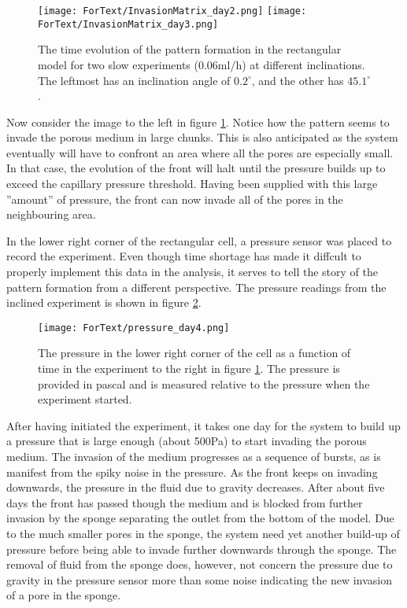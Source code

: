 \documentclass[twoside,utf8]{article}
\begin{document}
\begin{figure}[H]
	\begin{center}
\texttt{[image: ForText/InvasionMatrix\_day2.png]}
\texttt{[image: ForText/InvasionMatrix\_day3.png]}
	\end{center}
	\caption{The time evolution of the pattern formation in the rectangular model for two slow experiments (0.06ml/h) at different inclinations. The leftmost has an inclination angle of $0.2^\circ$, and the other has $45.1^\circ$. }
	\label{fig:InvasionMatricesSlow}
\end{figure}


\noindent
Now consider the image to the left in figure \ref{fig:InvasionMatricesSlow}. Notice how the pattern seems to invade the porous medium in large chunks. This is also anticipated as the system eventually will have to confront an area where all the pores are especially small. In that case, the evolution of the front will halt until the pressure builds up to exceed the capillary pressure threshold. Having been supplied with this large ''amount'' of pressure, the front can now invade all of the pores in the neighbouring area.



In the lower right corner of the rectangular cell, a pressure sensor was placed to record the experiment. Even though time shortage has made it diffcult to properly implement this data in the analysis, it serves to tell the story of the pattern formation from a different perspective. The pressure readings from the inclined experiment is shown in figure \ref{fig:pressureDay4}.

\begin{figure}[H]
	\texttt{[image: ForText/pressure\_day4.png]}
	\caption{The pressure in the lower right corner of the cell as a function of time in the experiment to the right in figure \ref{fig:InvasionMatricesSlow}. The pressure is provided in pascal and is measured relative to the pressure when the experiment started.  }
	\label{fig:pressureDay4}
\end{figure}

\noindent
After having initiated the experiment, it takes one day for the system to build up a pressure that is large enough (about 500Pa) to start invading the porous medium. The invasion of the medium progresses as a sequence of bursts, as is manifest from the spiky noise in the pressure. As the front keeps on invading downwards, the pressure in the fluid due to gravity decreases. After about five days the front has passed though the medium and is blocked from further invasion by the sponge separating the outlet from the bottom of the model. Due to the much smaller pores in the sponge, the system need yet another build-up of pressure before being able to invade further downwards through the sponge. The removal of fluid from the sponge does, however, not concern the pressure due to gravity in the pressure sensor more than some noise indicating the new invasion of a pore in the sponge.
\end{document}
